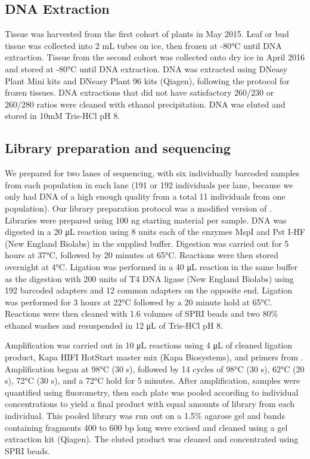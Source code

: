 \documentclass{article}
\begin{document}
\subsection*{DNA Extraction}
Tissue was harvested from the first cohort of plants in May 2015. Leaf or bud tissue was collected into 2 mL tubes on ice, then frozen at -80\si{\degree}C until DNA extraction. Tissue from the second cohort was collected onto dry ice in April 2016 and stored at -80\si{\degree}C until DNA extraction. DNA was extracted using DNeasy Plant Mini kits and DNeasy Plant 96 kits (Qiagen), following the protocol for frozen tissues. DNA extractions that did not have satisfactory 260/230 or 260/280 ratios were cleaned with ethanol precipitation. DNA was eluted and stored in 10mM Tris-HCl pH 8.

\subsection*{Library preparation and sequencing}
We prepared for two lanes of sequencing, with six individually barcoded samples from each population in each lane (191 or 192 individuals per lane, because we only had DNA of a high enough quality from a total 11 individuals from one population). Our library preparation protocol was a modified version of \cite{poland2012development}. Libraries were prepared using 100 ng starting material per sample. DNA was digested in a 20 \si{\micro\liter} reaction using 8 units each of the enzymes MspI and Pst I-HF (New England Biolabs) in the supplied buffer. Digestion was carried out for 5 hours at 37\si{\degree}C, followed by 20 minutes at 65\si{\degree}C. Reactions were then stored overnight at 4\si{\degree}C. Ligation was performed in a 40 \si{\micro\liter} reaction in the same buffer as the digestion with 200 units of T4 DNA ligase (New England Biolabs) using 192 barcoded adapters and 12 common adapters on the opposite end. Ligation was performed for 3 hours at 22\si{\degree}C followed by a 20 minute hold at 65\si{\degree}C. Reactions were then cleaned with 1.6 volumes of SPRI beads and two 80\% ethanol washes and resuspended in 12 \si{\micro\liter} of Tris-HCl pH 8.

Amplification was carried out in 10 \si{\micro\liter} reactions using 4 \si{\micro\liter} of cleaned ligation product, Kapa HIFI HotStart master mix (Kapa Biosystems), and primers from \cite{poland2012development}. Amplification began at 98\si{\degree}C (30 s), followed by 14 cycles of 98\si{\degree}C (30 s), 62\si{\degree}C (20 s), 72\si{\degree}C (30 s), and a 72\si{\degree}C hold for 5 minutes. After amplification, samples were quantified using fluorometry, then each plate was pooled according to individual concentrations to yield a final product with equal amounts of library from each individual. This pooled library was run out on a 1.5\% agarose gel and bands containing fragments 400 to 600 bp long were excised and cleaned using a gel extraction kit (Qiagen). The eluted product was cleaned and concentrated using SPRI beads.
\end{document}

